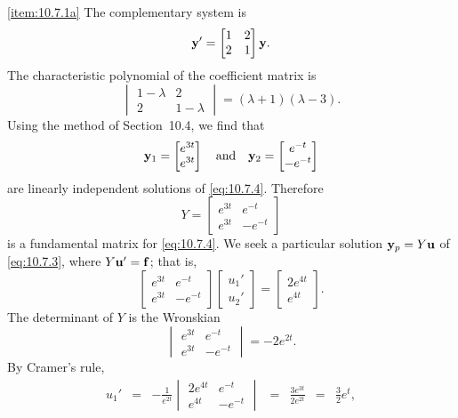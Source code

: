 \documentclass{ximera}
\begin{document}
\begin{example}
\begin{explanation}
\ref{item:10.7.1a} The complementary system is
\begin{equation} \label{eq:10.7.4}
{\bf y}'=\begin{bmatrix}1&2\\2&1\end{bmatrix}{\bf y}.
\end{equation}
The characteristic polynomial of the coefficient matrix is
$$
\begin{vmatrix}1-\lambda&2\\2&1-\lambda\end{vmatrix}=
(\lambda+1)(\lambda-3).
$$
Using the method of Section~10.4, we find that
$$
{\bf y}_1=\begin{bmatrix}e^{3t}\\e^{3t}\end{bmatrix}
\quad\mbox{and}\quad
{\bf y}_2=\begin{bmatrix}e^{-t}\\-e^{-t}\end{bmatrix}
$$
are linearly independent solutions of \eqref{eq:10.7.4}.
Therefore
$$
Y=\begin{bmatrix}e^{3t}&e^{-t}\\e^{3t}&-e^{-t}\end{bmatrix}
$$
is a fundamental matrix for \eqref{eq:10.7.4}. We seek a particular
solution ${\bf y}_p=Y{\bf u}$ of \eqref{eq:10.7.3}, where $Y{\bf u}'={\bf f}$; that is,
$$
\begin{bmatrix}e^{3t}&e^{-t}\\e^{3t}&-e^{-t}\end{bmatrix}
\begin{bmatrix}u_1'\\u_2'\end{bmatrix}
=\begin{bmatrix}2e^{4t}\\e^{4t}\end{bmatrix}.
$$
The determinant of $Y$ is the Wronskian
$$
\begin{vmatrix}e^{3t}&e^{-t}\\e^{3t}&-e^{-t}\end{vmatrix}
=-2e^{2t}.
$$
By Cramer's rule,
$$
\begin{array}{ccccccl}
u_1'&=&-\frac{1}{e^{2t}}
\begin{vmatrix}2e^{4t}&e^{-t}\\e^{4t}&-e^{-t}
\end{vmatrix}&=&\frac{3e^{3t}}{2e^{2t}}&=
&\frac{3}{2}e^t,\\

\end{array}$$
\end{explanation}
\end{example}
\end{document}
